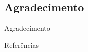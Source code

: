 \subsection{Agradecimento}
\begin{frame}{Agradecimento}
	
	\begin{center}
	 \centering
	 
	\hspace*{-1cm}
	\end{center}
	\centering

\end{frame}


\begin{frame}[allowframebreaks]{Referências}
%	
	
\end{frame}


